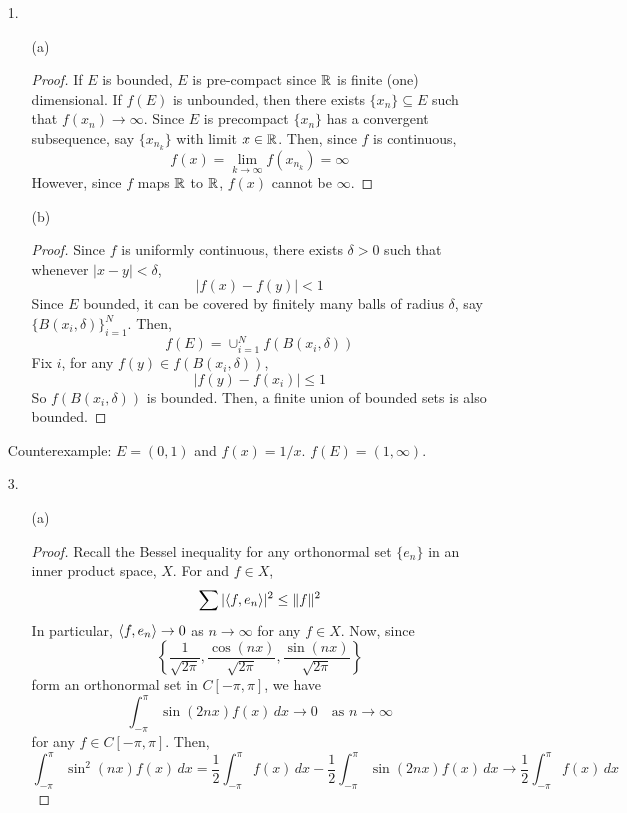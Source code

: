 \begin{itemize}
\item[1.]
	\begin{itemize}
		\item[(a)] \begin{proof} If $E$ is bounded, $E$ is pre-compact since $\mathbb{R}$ is finite (one) dimensional. If $f(E)$ is unbounded, then there exists $\{x_n\} \subseteq E$ such that $f(x_n) \to \infty$. Since $E$ is precompact $\{x_n\}$ has a convergent subsequence, say $\{x_{n_k}\}$ with limit $x \in \mathbb{R}$. Then, since $f$ is continuous,
		\[ f(x) = \lim_{k \to \infty} f(x_{n_k}) = \infty \]
	However, since $f$ maps $\mathbb{R}$ to $\mathbb{R}$, $f(x)$ cannot be $\infty$. 
		\end{proof}
		
		\item[(b)]
		\begin{proof}
		Since $f$ is uniformly continuous, there exists $\delta >0$ such that whenever $|x-y|<\delta$, 
		\[ |f(x)-f(y)| <1 \]
		Since $E$  bounded, it can be covered by finitely many balls of radius $\delta$, say $\{B(x_i,\delta)\}_{i=1}^N$. Then,
		\[ f(E) = \cup_{i=1}^N f(B(x_i,\delta)) \]
		Fix $i$, for any $f(y) \in f(B(x_i,\delta))$,
			\[ |f(y)-f(x_i)| \le 1 \]
		So $f(B(x_i,\delta))$ is bounded. Then, a finite union of bounded sets is also bounded.
		\end{proof}
	\end{itemize}
Counterexample: $E=(0,1)$ and $f(x)=1/x$. $f(E) = (1,\infty)$.

\item[3.]
	\begin{itemize}
		\item[(a)]\begin{proof} Recall the Bessel inequality for any orthonormal set $\{e_n\}$ in an inner product space, $X$. For and $f \in X$,
		\[ \sum |\langle f,e_n\rangle|^2 \le \|f\|^2 \]
		In particular, $\langle f,e_n\rangle \to 0$ as $n \to \infty$ for any $f \in X$. Now, since 
		\[ \left\{ \dfrac{1}{\sqrt{2\pi}},\dfrac{\cos(n x)}{\sqrt{2\pi}},\dfrac{\sin(n x)}{\sqrt{2\pi}}\right\} \]
		form an orthonormal set in $C[-\pi,\pi]$, we have
		\[ \int_{-\pi}^\pi \sin(2 n x) f(x) \, dx \to 0 \quad \mbox{as } n \to \infty\]
		for any $f \in C[-\pi,\pi]$. Then,
		\[ \int_{-\pi}^\pi \sin^2(nx) f(x) \,dx = \dfrac 12 \int_{-\pi}^\pi f(x) \, dx - \dfrac 12 \int_{-\pi}^\pi \sin(2 n x)f(x) \, dx \to \dfrac 12 \int_{-\pi}^\pi f(x) \, dx \]
		\end{proof}


\end{itemize}
\end{itemize}
